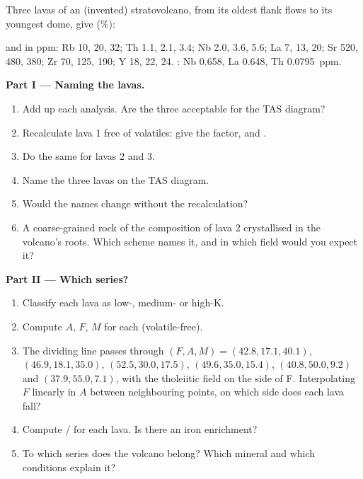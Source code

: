 \begin{problem}
\label{pb:b2:magmatic-series:1}
Three lavas of an (invented) stratovolcano, from its oldest flank flows to its youngest
dome, give (\unit{\percent}):

\smallskip{}

\smallskip\noindent and in ppm: Rb 10, 20, 32; Th 1.1, 2.1, 3.4; Nb 2.0, 3.6, 5.6;
La 7, 13, 20; Sr 520, 480, 380; Zr 70, 125, 190; Y 18, 22, 24. : Nb
0.658, La 0.648, Th \qty{0.0795}{ppm}.

\noindent\textbf{Part I --- Naming the lavas.}
\begin{enumerate}
\item Add up each analysis. Are the three acceptable for the TAS diagram?
\item Recalculate lava 1 free of volatiles: give the factor,  and
.
\item Do the same for lavas 2 and 3.
\item Name the three lavas on the TAS diagram.
\item Would the names change without the recalculation?
\item A coarse-grained rock of the composition of lava 2 crystallised in the volcano's
roots. Which scheme names it, and in which field would you expect it?
\end{enumerate}

\noindent\textbf{Part II --- Which series?}
\begin{enumerate}[resume]
\item Classify each lava as low-, medium- or high-K.
\item Compute $A$, $F$, $M$ for each (volatile-free).
\item The dividing line passes through $(F, A, M) = (42.8, 17.1, 40.1)$, $(46.9, 18.1,
35.0)$, $(52.5, 30.0, 17.5)$, $(49.6, 35.0, 15.4)$, $(40.8, 50.0, 9.2)$ and $(37.9,
55.0, 7.1)$, with the tholeiitic field on the side of F. Interpolating $F$ linearly in
$A$ between neighbouring points, on which side does each lava fall?
\item Compute / for each lava. Is there an iron enrichment?
\item To which series does the volcano belong? Which mineral and which conditions
explain it?
\end{enumerate}


\end{problem}
